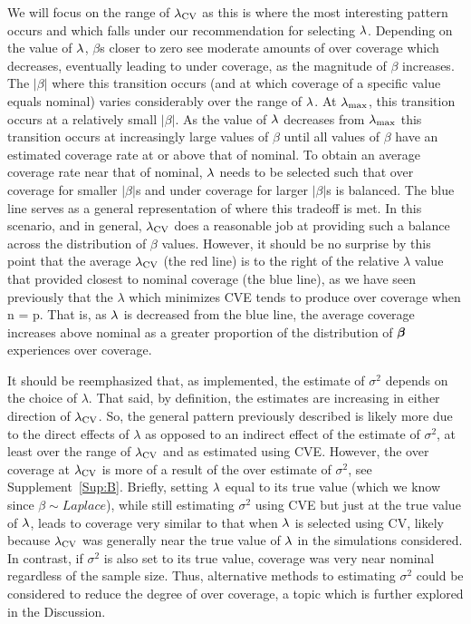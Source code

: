 
We will focus on the range of $\lambda_{\textrm{CV}}$ as this is where the most interesting pattern occurs and which falls under our recommendation for selecting $\lambda$. Depending on the value of $\lambda$, $\beta$s closer to zero see moderate amounts of over coverage which decreases, eventually leading to under coverage, as the magnitude of $\beta$ increases. The $|\beta|$ where this transition occurs (and at which coverage of a specific value equals nominal) varies considerably over the range of $\lambda$. At $\lambda_{\max}$, this transition occurs at a relatively small $|\beta|$. As the value of $\lambda$ decreases from $\lambda_{\max}$ this transition occurs at increasingly large values of $\beta$ until all values of $\beta$ have an estimated coverage rate at or above that of nominal. To obtain an average coverage rate near that of nominal, $\lambda$ needs to be selected such that over coverage for smaller $|\beta|$s and under coverage for larger $|\beta|$s is balanced. The blue line serves as a general representation of where this tradeoff is met. In this scenario, and in general, $\lambda_{\textrm{CV}}$ does a reasonable job at providing such a balance across the distribution of $\beta$ values. However, it should be no surprise by this point that the average $\lambda_{\textrm{CV}}$ (the red line) is to the right of the relative $\lambda$ value that provided closest to nominal coverage (the blue line), as we have seen previously that the $\lambda$ which minimizes CVE tends to produce over coverage when n = p. That is, as $\lambda$ is decreased from the blue line, the average coverage increases above nominal as a greater proportion of the distribution of $\boldsymbol{\beta}$ experiences over coverage.

It should be reemphasized that, as implemented, the estimate of $\sigma^2$ depends on the choice of $\lambda$. That said, by definition, the estimates are increasing in either direction of $\lambda_{\textrm{CV}}$. So, the general pattern previously described is likely more due to the direct effects of $\lambda$ as opposed to an indirect effect of the estimate of $\sigma^2$, at least over the range of $\lambda_{\textrm{CV}}$ and as estimated using CVE. However, the over coverage at $\lambda_{\textrm{CV}}$ is more of a result of the over estimate of $\sigma^2$, see Supplement~\ref{Sup:B}. Briefly, setting $\lambda$ equal to its true value (which we know since $\beta \sim Laplace$), while still estimating $\sigma^2$ using CVE but just at the true value of $\lambda$, leads to coverage very similar to that when $\lambda$ is selected using CV, likely because $\lambda_{\textrm{CV}}$ was generally near the true value of $\lambda$ in the simulations considered. In contrast, if $\sigma^2$ is also set to its true value, coverage was very near nominal regardless of the sample size. Thus, alternative methods to estimating $\sigma^2$ could be considered to reduce the degree of over coverage, a topic which is further explored in the Discussion.

